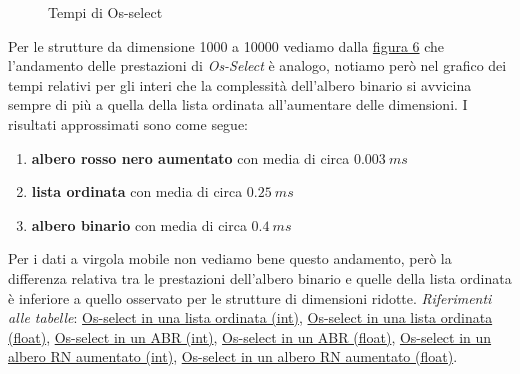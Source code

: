 \documentclass[onecolumn]{article}
\begin{document}
\begin{figure}[H]
	\caption{Tempi di Os-select}
	\label{fig:os-select-m}
\end{figure}

Per le strutture da dimensione 1000 a 10000 vediamo dalla \hyperref[fig:os-select-m]{figura 6} che l'andamento delle prestazioni di \textit{Os-Select} è analogo, notiamo però nel grafico dei tempi relativi per gli interi che la complessità dell'albero binario si avvicina sempre di più a quella della lista ordinata all'aumentare delle dimensioni. I risultati approssimati sono come segue:

\begin{enumerate}
    \item \textbf{albero rosso nero aumentato} con media di circa \(0.003\:ms\)
    \item \textbf{lista ordinata} con media di circa \(0.25\:ms\)
    \item \textbf{albero binario} con media di circa \(0.4\:ms\)
\end{enumerate}

Per i dati a virgola mobile non vediamo bene questo andamento, però la differenza relativa tra le prestazioni dell'albero binario e quelle della lista ordinata è inferiore a quello osservato per le strutture di dimensioni ridotte. 
\newline
\textit{Riferimenti alle tabelle}: \hyperref[label:lista-ordinata-m-os-select]{Os-select in una lista ordinata (int)}, \hyperref[label:lista-ordinata-m-float-os-select]{Os-select in una lista ordinata (float)}, \hyperref[label:abr-m-os-select]{Os-select in un ABR (int)}, \hyperref[label:abr-m-float-os-select]{Os-select in un ABR (float)}, \hyperref[label:rn-aumentato-m-os-select]{Os-select in un albero RN aumentato (int)}, \hyperref[label:rn-aumentato-m-float-os-select]{Os-select in un albero RN aumentato (float)}.
\end{document}
